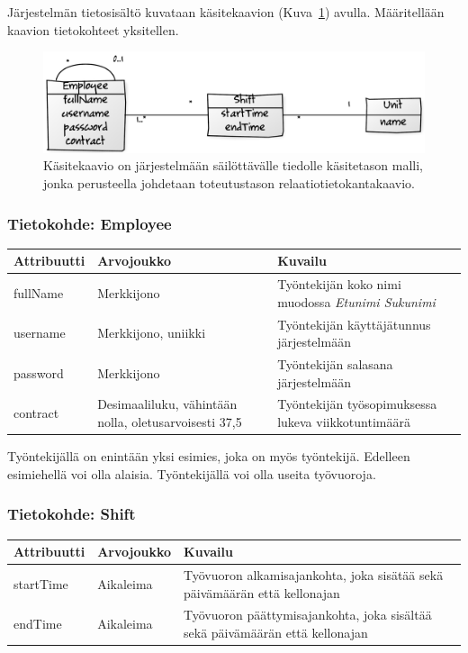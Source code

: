 \documentclass[10pt,titlepage,hidelinks]{scrartcl}
\begin{document}
Järjestelmän tietosisältö kuvataan käsitekaavion (Kuva~\ref{fig:kasitekaavio}) avulla. Määritellään kaavion tietokohteet yksitellen.

\begin{figure}[tb]
\centering
\includegraphics[width=.5\textwidth]{e85adf45}
\caption{Käsitekaavio on järjestelmään säilöttävälle tiedolle käsitetason malli, jonka perusteella johdetaan toteutustason relaatiotietokantakaavio.}
\label{fig:kasitekaavio}
\end{figure}

\subsubsection*{Tietokohde: Employee}
{\footnotesize \begin{tabu} to 
\toprule
Attribuutti & Arvojoukko & Kuvailu \\
\midrule
fullName & Merkkijono & Työntekijän koko nimi muodossa \emph{Etunimi Sukunimi} \\
username & Merkkijono, uniikki & Työntekijän käyttäjätunnus järjestelmään \\
password & Merkkijono & Työntekijän salasana järjestelmään \\
contract & Desimaaliluku, vähintään nolla, oletusarvoisesti 37,5 & Työntekijän työsopimuksessa lukeva viikkotuntimäärä \\
\bottomrule
\end{tabu}}\smallskip

\noindent Työntekijällä on enintään yksi esimies, joka on myös työntekijä. Edelleen esimiehellä voi olla alaisia. Työntekijällä voi olla useita työvuoroja.

\subsubsection*{Tietokohde: Shift}
{\footnotesize \begin{tabu} to 
\toprule
Attribuutti & Arvojoukko & Kuvailu \\
\midrule
startTime & Aikaleima & Työvuoron alkamisajankohta, joka sisätää sekä päivämäärän että kellonajan \\
endTime & Aikaleima & Työvuoron päättymisajankohta, joka sisältää sekä päivämäärän että kellonajan \\
\bottomrule
\end{tabu}}\smallskip
\end{document}
